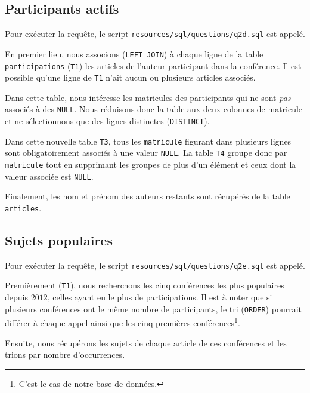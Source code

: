 \documentclass[a4paper, 12pt]{article}
\begin{document}
    \subsection{Participants actifs}
    Pour exécuter la requête, le script \texttt{resources/sql/questions/q2d.sql} est appelé.
    
    En premier lieu, nous associons (\texttt{LEFT JOIN}) à chaque ligne de la table \texttt{participations} (\texttt{T1}) les articles de l'auteur participant dans la conférence. Il est possible qu'une ligne de \texttt{T1} n'ait aucun ou plusieurs articles associés. \par
    Dans cette table, nous intéresse les matricules des participants qui ne sont \emph{pas} associés à des \texttt{NULL}. Nous réduisons donc la table aux deux colonnes de matricule et ne sélectionnons que des lignes distinctes (\texttt{DISTINCT}). \par
    Dans cette nouvelle table \texttt{T3}, tous les \texttt{matricule} figurant dans plusieurs lignes sont obligatoirement associés à une valeur \texttt{NULL}. La table \texttt{T4} groupe donc par \texttt{matricule} tout en supprimant les groupes de plus d'un élément et ceux dont la valeur associée est \texttt{NULL}. \par
    Finalement, les nom et prénom des auteurs restants sont récupérés de la table \texttt{articles}.
    \newpage
    \subsection{Sujets populaires}
    Pour exécuter la requête, le script \texttt{resources/sql/questions/q2e.sql} est appelé.
    
    Premièrement (\texttt{T1}), nous recherchons les cinq conférences les plus populaires depuis $2012$, \cad{} celles ayant eu le plus de participations. Il est à noter que si plusieurs conférences ont le même nombre de participants, le tri (\texttt{ORDER}) pourrait différer à chaque appel ainsi que les cinq premières conférences\footnote{C'est le cas de notre base de données.}. \par
    Ensuite, nous récupérons les sujets de chaque article de ces conférences et les trions par nombre d'occurrences.
\end{document}

